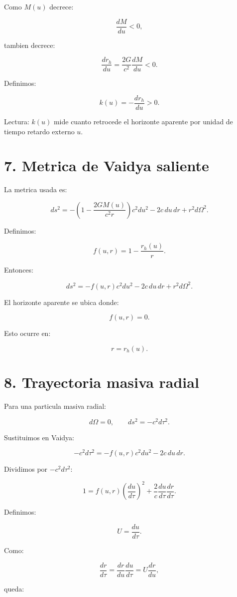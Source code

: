 ﻿\documentclass[11pt,a4paper]{article}
\begin{document}
Como \(M(u)\) decrece:

\[
\frac{dM}{du}<0,
\]

tambien decrece:

\[
\frac{dr_h}{du}
=
\frac{2G}{c^2}\frac{dM}{du}
<0.
\]

Definimos:

\[
k(u)
=
-
\frac{dr_h}{du}
>0.
\]

Lectura: \(k(u)\) mide cuanto retrocede el horizonte aparente por unidad de tiempo retardo externo \(u\).

\section{7. Metrica de Vaidya saliente}

La metrica usada es:

\[
ds^2
=
-
\left(
1-\frac{2GM(u)}{c^2r}
\right)c^2du^2
-2c\,du\,dr
+r^2d\Omega^2.
\]

Definimos:

\[
f(u,r)
=
1-\frac{r_h(u)}{r}.
\]

Entonces:

\[
ds^2
=
-
f(u,r)c^2du^2
-2c\,du\,dr
+r^2d\Omega^2.
\]

El horizonte aparente se ubica donde:

\[
f(u,r)=0.
\]

Esto ocurre en:

\[
r=r_h(u).
\]

\section{8. Trayectoria masiva radial}

Para una particula masiva radial:

\[
d\Omega=0,
\qquad
ds^2=-c^2d\tau^2.
\]

Sustituimos en Vaidya:

\[
-c^2d\tau^2
=
-
f(u,r)c^2du^2
-2c\,du\,dr.
\]

Dividimos por \(-c^2d\tau^2\):

\[
1
=
f(u,r)
\left(\frac{du}{d\tau}\right)^2
+
\frac{2}{c}
\frac{du}{d\tau}
\frac{dr}{d\tau}.
\]

Definimos:

\[
U=\frac{du}{d\tau}.
\]

Como:

\[
\frac{dr}{d\tau}
=
\frac{dr}{du}\frac{du}{d\tau}
=
U\frac{dr}{du},
\]

queda:
\end{document}
